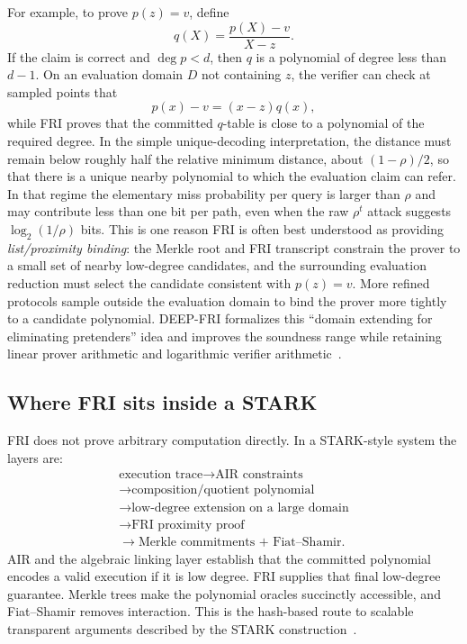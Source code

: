 For example, to prove $p(z)=v$, define
\[
    q(X)=\frac{p(X)-v}{X-z}.
\]
If the claim is correct and $\deg p<d$, then $q$ is a polynomial of degree less than $d-1$.
On an evaluation domain $D$ not containing $z$, the verifier can check at sampled points that
\[
    p(x)-v=(x-z)q(x),
\]
while FRI proves that the committed $q$-table is close to a polynomial of the required degree.
In the simple unique-decoding interpretation, the distance must remain below roughly half the
relative minimum distance, about $(1-\rho)/2$, so that there is a unique nearby polynomial to
which the evaluation claim can refer. In that regime the elementary miss probability per query
is larger than $\rho$ and may contribute less than one bit per path, even when the raw
$\rho^t$ attack suggests $\log_2(1/\rho)$ bits. This is one reason FRI is often best understood
as providing \emph{list/proximity binding}: the Merkle root and FRI transcript constrain the
prover to a small set of nearby low-degree candidates, and the surrounding evaluation reduction
must select the candidate consistent with $p(z)=v$.
More refined protocols sample outside the evaluation domain to bind the prover more tightly
to a candidate polynomial. DEEP-FRI formalizes this ``domain extending for eliminating
pretenders'' idea and improves the soundness range while retaining linear prover arithmetic
and logarithmic verifier arithmetic~\cite{BenSassonGoldbergKoppartySaraf2020DEEPFRI}.

\subsection{Where FRI sits inside a STARK}

FRI does not prove arbitrary computation directly. In a STARK-style system the layers are:
\[
\boxed{
\begin{array}{c}
\text{execution trace}\longrightarrow\text{AIR constraints}\\
\longrightarrow\text{composition/quotient polynomial}\\
\longrightarrow\text{low-degree extension on a large domain}\\
\longrightarrow\text{FRI proximity proof}\\
\longrightarrow\text{Merkle commitments + Fiat--Shamir}.
\end{array}}
\]
AIR and the algebraic linking layer establish that the committed polynomial encodes a valid
execution if it is low degree. FRI supplies that final low-degree guarantee. Merkle trees make
the polynomial oracles succinctly accessible, and Fiat--Shamir removes interaction. This is
the hash-based route to scalable transparent arguments described by the STARK
construction~\cite{BenSassonBentovHoreshRiabzev2018STARK}.

